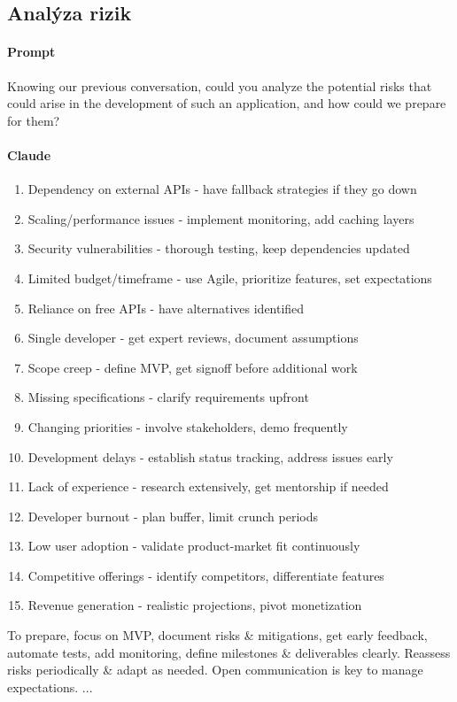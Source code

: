 \documentclass[FM,DP]{tulthesis}
\begin{document}
		\subsection{Analýz\vspace{0.6em}a rizik}
		\begin{tcolorbox}[colback=white,colframe=black]
			\paragraph{Prompt} 
			Knowing our previous conversation, could you analyze the potential risks that could arise in the development of such an application, and how could we prepare for them?
			
			
			\vspace{0.6em}
			
			\paragraph{Claude} 
			\begin{enumerate}
				\item Dependency on external APIs - have fallback strategies if they go down
				\item Scaling/performance issues - implement monitoring, add caching layers
				\item Security vulnerabilities - thorough testing, keep dependencies updated
				\item Limited budget/timeframe - use Agile, prioritize features, set expectations
				\item Reliance on free APIs - have alternatives identified
				\item Single developer - get expert reviews, document assumptions
				\item Scope creep - define MVP, get signoff before additional work
				\item Missing specifications - clarify requirements upfront
				\item Changing priorities - involve stakeholders, demo frequently
				\item Development delays - establish status tracking, address issues early
				\item Lack of experience - research extensively, get mentorship if needed
				\item Developer burnout - plan buffer, limit crunch periods
				\item Low user adoption - validate product-market fit continuously
				\item Competitive offerings - identify competitors, differentiate features
				\item Revenue generation - realistic projections, pivot monetization
			\end{enumerate}
			
			To prepare, focus on MVP, document risks \& mitigations, get early feedback, automate tests, add monitoring, define milestones \& deliverables clearly. Reassess risks periodically \& adapt as needed. Open communication is key to manage expectations.
			... \cite{claude_analyza}
		\end{tcolorbox}
		\vspace{0.6em}
		
\end{document}
